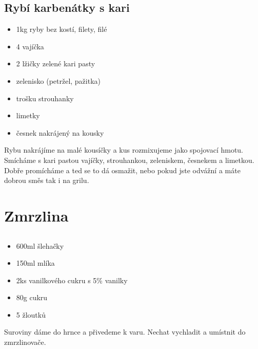\documentclass[10pt,a4paper]{article}
\newenvironment{myitemize}
{ \begin{itemize}
    \setlength{\itemsep}{0pt}
    \setlength{\parskip}{0pt}
    \setlength{\parsep}{0pt}     }
{ \end{itemize}                  }
\begin{document}
\subsection{Rybí karbenátky s kari}
\begin{minipage}[t]{0,5\textwidth}
\begin{myitemize} 
\item 1kg ryby bez kostí, filety, filé
\item 4 vajíčka
\item 2 lžičky zelené kari pasty
\item zelenisko (petržel, pažitka)
\item trošku strouhanky
\item limetky
\item česnek nakrájený na kousky
\end{myitemize}
\end{minipage}
\begin{minipage}[t]{0,5\textwidth}
Rybu nakrájíme na malé kousíčky a kus rozmixujeme jako spojovací hmotu. Smícháme s kari pastou vajíčky, strouhankou, zeleniskem, česnekem a limetkou. Dobře promícháme a ted se to dá osmažit, nebo pokud jste odvážní a máte dobrou směs tak i na grilu.
\end{minipage}
\pagebreak
\section{Zmrzlina}
\subsection{}
\begin{minipage}[t]{0,5\textwidth}
\begin{myitemize} 
\item 600ml šlehačky
\item 150ml mlíka
\item 2ks vanilkového cukru s 5\% vanilky
\item 80g cukru
\item 5 žloutků
\end{myitemize}
\end{minipage}
\begin{minipage}[t]{0,5\textwidth}
Suroviny dáme do hrnce a přivedeme k varu. Nechat vychladit a umístnit do zmrzlinovače.
\end{minipage}
\end{document}

